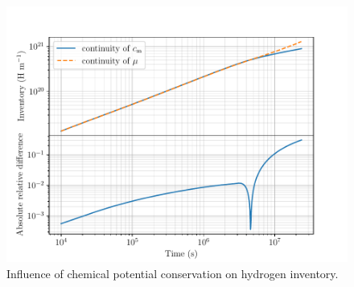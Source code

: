 \begin{figure}
    \centering
    \includegraphics[width=\linewidth]{Figures/Chapter3/monoblocks/interface_condition/iter case/comparison_inventory_2d.pdf}
    \caption{Influence of chemical potential conservation on hydrogen inventory.}
    \label{fig: 2D inventories}
\end{figure}


